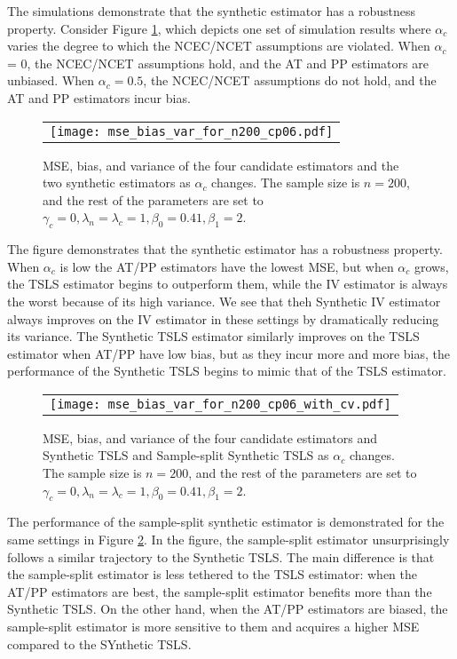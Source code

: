 \documentclass{article}
\begin{document}
The simulations demonstrate that the synthetic estimator has a robustness property. Consider Figure \ref{mse_plot_1}, which depicts one set of simulation results where $\alpha_c$ varies the degree to which the NCEC/NCET assumptions are violated. When $\alpha_c$ = 0, the NCEC/NCET assumptions hold, and the AT and PP estimators are unbiased. When $\alpha_c = 0.5$, the NCEC/NCET assumptions do not hold, and the AT and PP estimators incur bias. 
%
\begin{figure}
\centering
\begin{tabular}{c}
\texttt{[image: mse\_bias\_var\_for\_n200\_cp06.pdf]}
\end{tabular}\vspace{0.2in}
\caption{MSE, bias, and variance of the four candidate estimators and the two synthetic estimators as $\alpha_c$ changes. The sample size is $n = 200$, and the rest of the parameters are set to $\gamma_c = 0, \lambda_n = \lambda_c = 1, \beta_0 = 0.41, \beta_1 = 2$.}\label{mse_plot_1}
\end{figure}
%
The figure demonstrates that the synthetic estimator has a robustness property. When $\alpha_c$ is low the AT/PP estimators have the lowest MSE, but when $\alpha_c$ grows, the TSLS estimator begins to outperform them, while the IV estimator is always the worst because of its high variance. We see that theh Synthetic IV estimator always improves on the IV estimator in these settings by dramatically reducing its variance. The Synthetic TSLS estimator similarly improves on the TSLS estimator when AT/PP have low bias, but as they incur more and more bias, the performance of the Synthetic TSLS begins to mimic that of the TSLS estimator. 

\begin{figure}
\centering
\begin{tabular}{c}
\texttt{[image: mse\_bias\_var\_for\_n200\_cp06\_with\_cv.pdf]}
\end{tabular}\vspace{0.2in}
\caption{MSE, bias, and variance of the four candidate estimators and Synthetic TSLS and Sample-split Synthetic TSLS as $\alpha_c$ changes. The sample size is $n = 200$, and the rest of the parameters are set to $\gamma_c = 0, \lambda_n = \lambda_c = 1, \beta_0 = 0.41, \beta_1 = 2$.}\label{mse_plot_2}
\end{figure}
%
The performance of the sample-split synthetic estimator is demonstrated for the same settings in Figure \ref{mse_plot_2}. In the figure, the sample-split estimator unsurprisingly follows a similar trajectory to the Synthetic TSLS. The main difference is that the sample-split estimator is less tethered to the TSLS estimator: when the AT/PP estimators are best, the sample-split estimator benefits more than the Synthetic TSLS. On the other hand, when the AT/PP estimators are biased, the sample-split estimator is more sensitive to them and acquires a higher MSE compared to the SYnthetic TSLS.



\end{document}
